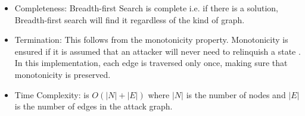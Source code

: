 \begin{itemize}
	\item Completeness: Breadth-first Search is complete i.e. if there is a solution, Breadth-first search will find it regardless of the kind of graph.
	\item Termination: This follows from the monotonicity property. Monotonicity is ensured if it is assumed that an attacker will never need to relinquish a state \cite{ingols2006practical, ou2006scalable, ammann2002scalable}. In this implementation, each edge is traversed only once, making sure that monotonicity is preserved.
	\item Time Complexity: is $O(|N| + |E|)$ where $|N|$ is the number of nodes and $|E|$ is the number of edges in the attack graph.
\end{itemize}